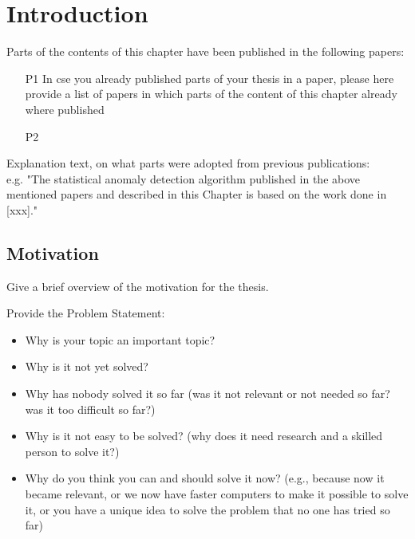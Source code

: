\chapter{Introduction}

\begin{Prev.Publ}
	Parts of the contents of this chapter have been published in the following papers:
	\begin{enumerate}
		\item [\lbrack P1\rbrack] In cse you already published parts of your thesis in a paper, please here provide a list of papers in which parts of the content of this chapter already where published  %
	\item [\lbrack P2\rbrack] 
	\end{enumerate}	
	
	Explanation text, on what parts were adopted from previous publications:\\
	e.g. "The statistical anomaly detection algorithm published in the above mentioned papers and described in this
	Chapter is based on the work done in [xxx]."	
\end{Prev.Publ}




\section{Motivation} \label{sect.motivation}



Give a brief overview of the motivation for the thesis.

Provide the Problem Statement: 
\begin{itemize}
	\item Why is your topic an important topic?
	\item Why is it not yet solved?
	\item Why has nobody solved it so far (was it not relevant or not needed so far? was it too difficult so far?)
	\item Why is it not easy to be solved? (why does it need research and a skilled person to solve it?)
	\item Why do you think you can and should solve it now? (e.g., because now it became relevant, or we now have faster computers to make it possible to solve it, or you have a unique idea to solve the problem that no one has tried so far)
\end{itemize}


